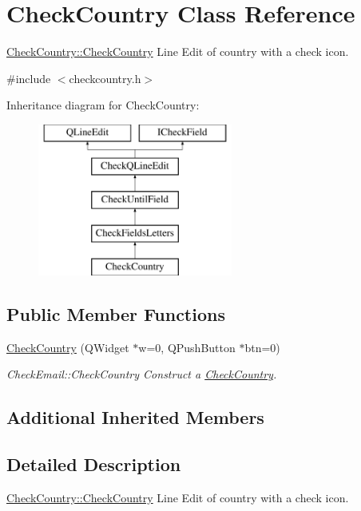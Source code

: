 \hypertarget{classCheckCountry}{\section{Check\+Country Class Reference}
\label{classCheckCountry}
}


\hyperlink{classCheckCountry_aa6aa76f22635d879105449836dd68bbd}{Check\+Country\+::\+Check\+Country} Line Edit of country with a check icon.  




{\ttfamily \#include $<$checkcountry.\+h$>$}

Inheritance diagram for Check\+Country\+:\begin{figure}[H]
\begin{center}
\leavevmode
\includegraphics[height=5.000000cm]{d6/d52/classCheckCountry}
\end{center}
\end{figure}
\subsection*{Public Member Functions}
\begin{DoxyCompactItemize}
\item 
\hyperlink{classCheckCountry_aa6aa76f22635d879105449836dd68bbd}{Check\+Country} (Q\+Widget $\ast$w=0, Q\+Push\+Button $\ast$btn=0)
\begin{DoxyCompactList}\small\item\em Check\+Email\+::\+Check\+Country Construct a \hyperlink{classCheckCountry}{Check\+Country}. \end{DoxyCompactList}\end{DoxyCompactItemize}
\subsection*{Additional Inherited Members}


\subsection{Detailed Description}
\hyperlink{classCheckCountry_aa6aa76f22635d879105449836dd68bbd}{Check\+Country\+::\+Check\+Country} Line Edit of country with a check icon. 

